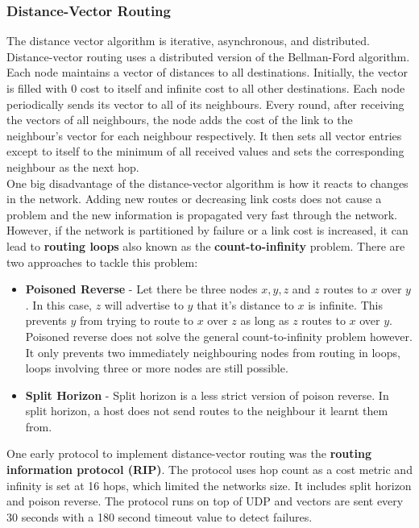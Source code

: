 \subsubsection{Distance-Vector Routing}
The distance vector algorithm is iterative, asynchronous, and distributed. Distance-vector routing uses a distributed version of the Bellman-Ford algorithm. Each node maintains a vector of distances to all destinations. Initially, the vector is filled with 0 cost to itself and infinite cost to all other destinations. Each node periodically sends its vector to all of its neighbours. Every round, after receiving the vectors of all neighbours, the node adds the cost of the link to the neighbour's vector for each neighbour respectively. It then sets all vector entries except to itself to the minimum of all received values and sets the corresponding neighbour as the next hop.\vspace{.3cm}\\
One big disadvantage of the distance-vector algorithm is how it reacts to changes in the network. Adding new routes or decreasing link costs does not cause a problem and the new information is propagated very fast through the network. However, if the network is partitioned by failure or a link cost is increased, it can lead to \textbf{routing loops} also known as the \textbf{count-to-infinity} problem. There are two approaches to tackle this problem:
\begin{itemize}
\item \textbf{Poisoned Reverse} - Let there be three nodes $x, y, z$ and $z$ routes to $x$ over $y$. In this case, $z$ will advertise to $y$ that it's distance to $x$ is infinite. This prevents $y$ from trying to route to $x$ over $z$ as long as $z$ routes to $x$ over $y$. Poisoned reverse does not solve the general count-to-infinity problem however. It only prevents two immediately neighbouring nodes from routing in loops, loops involving three or more nodes are still possible.
\item \textbf{Split Horizon} - Split horizon is a less strict version of poison reverse. In split horizon, a host does not send routes to the neighbour it learnt them from.
\end{itemize}
One early protocol to implement distance-vector routing was the \textbf{routing information protocol (RIP)}. The protocol uses hop count as a cost metric and infinity is set at 16 hops, which limited the networks size. It includes split horizon and poison reverse. The protocol runs on top of UDP and vectors are sent every 30 seconds with a 180 second timeout value to detect failures.


